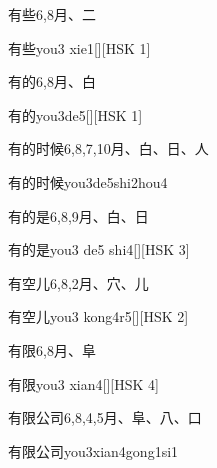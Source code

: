 \begin{entry}{有些}{6,8}{⽉、⼆}
  \begin{phonetics}{有些}{you3 xie1}[][HSK 1]
  \end{phonetics}
\end{entry}

\begin{entry}{有的}{6,8}{⽉、⽩}
  \begin{phonetics}{有的}{you3de5}[][HSK 1]
  \end{phonetics}
\end{entry}

\begin{entry}{有的时候}{6,8,7,10}{⽉、⽩、⽇、⼈}
  \begin{phonetics}{有的时候}{you3de5shi2hou4}
  \end{phonetics}
\end{entry}

\begin{entry}{有的是}{6,8,9}{⽉、⽩、⽇}
  \begin{phonetics}{有的是}{you3 de5 shi4}[][HSK 3]
  \end{phonetics}
\end{entry}

\begin{entry}{有空儿}{6,8,2}{⽉、⽳、⼉}
  \begin{phonetics}{有空儿}{you3 kong4r5}[][HSK 2]
  \end{phonetics}
\end{entry}

\begin{entry}{有限}{6,8}{⽉、⾩}
  \begin{phonetics}{有限}{you3 xian4}[][HSK 4]
  \end{phonetics}
\end{entry}

\begin{entry}{有限公司}{6,8,4,5}{⽉、⾩、⼋、⼝}
  \begin{phonetics}{有限公司}{you3xian4gong1si1}
  \end{phonetics}
\end{entry}

